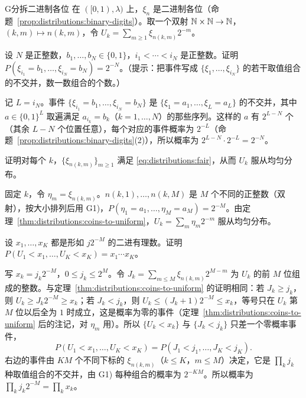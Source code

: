 
\begin{probleme}{G}{分拆二进制各位}
在 $([0,1),\lambda)$ 上，$\xi_n$ 是二进制各位（命题~\ref{prop:distributions:binary-digits}）。取一个双射 $\mathbb{N}\times\mathbb{N}\to\mathbb{N}$，$(k,m)\mapsto n(k,m)$，令 $U_k=\sum_{m\geqslant1}\xi_{n(k,m)}2^{-m}$。
\begin{questions}
\item 设 $N$ 是正整数，$b_1,\dots,b_N\in\{0,1\}$，$i_1<\cdots<i_N$ 是正整数。证明 $P(\xi_{i_1}=b_1,\dots,\xi_{i_N}=b_N)=2^{-N}$。（提示：把事件写成 $\{\xi_1,\dots,\xi_{i_N}\}$ 的若干取值组合的不交并，数一数组合的个数。）
\begin{solution}
记 $L=i_N$。事件 $\{\xi_{i_1}=b_1,\dots,\xi_{i_N}=b_N\}$ 是 $\{\xi_1=a_1,\dots,\xi_L=a_L\}$ 的不交并，其中 $a\in\{0,1\}^L$ 取遍满足 $a_{i_k}=b_k$（$k=1,\dots,N$）的那些序列。这样的 $a$ 有 $2^{L-N}$ 个（其余 $L-N$ 个位置任意），每个对应的事件概率为 $2^{-L}$（命题~\ref{prop:distributions:binary-digits}(2)），所以概率为 $2^{L-N}\cdot2^{-L}=2^{-N}$。
\end{solution}
\item 证明对每个 $k$，$\{\xi_{n(k,m)}\}_{m\geqslant1}$ 满足 \eqref{eq:distributions:fair}，从而 $U_k$ 服从均匀分布。
\begin{solution}
固定 $k$，令 $\eta_m=\xi_{n(k,m)}$。$n(k,1),\dots,n(k,M)$ 是 $M$ 个不同的正整数（双射），按大小排列后用 G1)，$P(\eta_1=a_1,\dots,\eta_M=a_M)=2^{-M}$。由定理~\ref{thm:distributions:coins-to-uniform}，$U_k=\sum_m\eta_m2^{-m}$ 服从均匀分布。
\end{solution}
\item 设 $x_1,\dots,x_K$ 都是形如 $j2^{-M}$ 的二进有理数。证明 $P(U_1<x_1,\dots,U_K<x_K)=x_1\cdots x_K$。
\begin{solution}
写 $x_k=j_k2^{-M}$，$0\leqslant j_k\leqslant2^M$。令 $J_k=\sum_{m\leqslant M}\xi_{n(k,m)}2^{M-m}$ 为 $U_k$ 的前 $M$ 位组成的整数。与定理~\ref{thm:distributions:coins-to-uniform} 的证明相同：若 $J_k\geqslant j_k$，则 $U_k\geqslant J_k2^{-M}\geqslant x_k$；若 $J_k<j_k$，则 $U_k\leqslant(J_k+1)2^{-M}\leqslant x_k$，等号只在 $U_k$ 第 $M$ 位以后全为 $1$ 时成立，这是概率为零的事件（定理~\ref{thm:distributions:coins-to-uniform} 后的注记，对 $\eta_m$ 用）。所以 $\{U_k<x_k\}$ 与 $\{J_k<j_k\}$ 只差一个零概率事件，
\[
P(U_1<x_1,\dots,U_K<x_K)=P(J_1<j_1,\dots,J_K<j_K).
\]
右边的事件由 $KM$ 个不同下标的 $\xi_{n(k,m)}$（$k\leqslant K$，$m\leqslant M$）决定，它是 $\prod_kj_k$ 种取值组合的不交并，由 G1) 每种组合的概率为 $2^{-KM}$。所以概率为 $\prod_kj_k2^{-M}=\prod_kx_k$。

\end{solution}
\end{questions}
\end{probleme}
